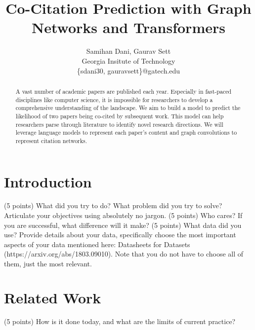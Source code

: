 \documentclass[10pt,twocolumn,letterpaper]{article}
\begin{document}
\title{Co-Citation Prediction with Graph Networks and Transformers}

\author{Samihan Dani, Gaurav Sett\\
Georgia Insitute of Technology\\
\{sdani30, gauravsett\}@gatech.edu
}
\maketitle


\begin{abstract}
   A vast number of academic papers are published each year. Especially in fast-paced disciplines like computer science, it is impossible for researchers to develop a comprehensive understanding of the landscape. We aim to build a model to predict the likelihood of two papers being co-cited by subsequent work. This model can help researchers parse through literature to identify novel research directions. We will leverage language models to represent each paper's content and graph convolutions to represent citation networks.
\end{abstract}


\section{Introduction}
\label{sec:intro}

(5 points) What did you try to do? What problem did you try to solve? Articulate your objectives
using absolutely no jargon.
(5 points) Who cares? If you are successful, what difference will it make?
(5 points) What data did you use? Provide details about your data, specifically choose the most
important aspects of your data mentioned here: Datasheets for Datasets
(https://arxiv.org/abs/1803.09010). Note that you do not have to choose all of them, just the most
relevant.


\section{Related Work}
(5 points) How is it done today, and what are the limits of current practice?
\end{document}
